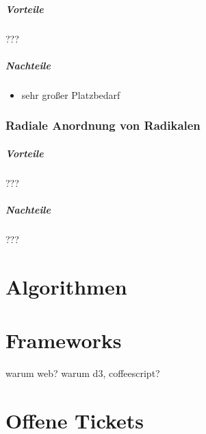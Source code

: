 \documentclass[color,german]{tudbook}
\begin{document}
\paragraph{Vorteile}
???

\paragraph{Nachteile}
\begin{itemize}
\item sehr großer Platzbedarf
\end{itemize}

\subsection{Radiale Anordnung von Radikalen}

\paragraph{Vorteile}
???

\paragraph{Nachteile}
???

\chapter{Algorithmen}

\chapter{Frameworks}
warum web?
warum d3, coffeescript?

\chapter{Offene Tickets}



\end{document}
